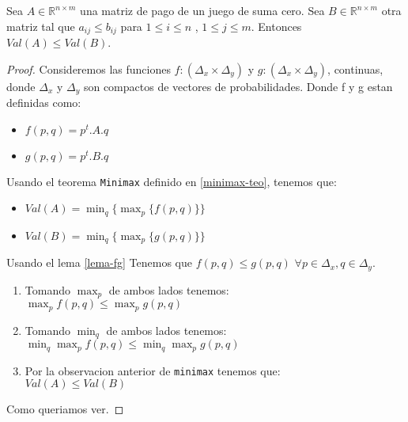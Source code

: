 \begin{theorem}
	Sea $A \in \mathbb{R}^{n \times m}$ una matriz de pago de un juego de suma cero. Sea $B \in \mathbb{R}^{n \times m}$ otra matriz tal que $a_{ij} \leq b_{ij}$ para $1 \leq i \leq n$   ,  $1 \leq j \leq m$. Entonces $Val(A) \leq Val(B)$.
\end{theorem}
\begin{proof}
	Consideremos las funciones $f:(\Delta_x \times \Delta_y)$ y $g:(\Delta_x \times \Delta_y)$, continuas, donde $\Delta_x$ y $\Delta_y$ son compactos de vectores de probabilidades. Donde f y g estan definidas como:
	\begin{itemize}
		\item $f(p, q) = p^t.A.q$ 
		\item $g(p, q) = p^t.B.q$ 
	\end{itemize}

	Usando el teorema \texttt{Minimax} definido en \ref{minimax-teo}, tenemos que:
	\begin{itemize}
		\item $Val(A) = \displaystyle\min_{q} \{    \displaystyle\max_{p} \{  f(p, q) \}    \}$
		\item $Val(B) = \displaystyle\min_{q} \{    \displaystyle\max_{p} \{  g(p, q) \}    \}$
	\end{itemize}

	Usando el lema \ref{lema-fg} Tenemos que $f(p, q) \leq g(p, q)$   $\forall p \in \Delta_x, q \in \Delta_y$.\\

\begin{enumerate}
	\item Tomando $\displaystyle\max_{p}$ de ambos lados tenemos:\\
	$ \displaystyle\max_{p} f(p, q) \leq  \displaystyle\max_{p} g(p, q)$
	
	\item Tomando $\displaystyle\min_{q}$ de ambos lados tenemos:\\
	$ \displaystyle\min_{q} \displaystyle\max_{p} f(p, q) \leq  \displaystyle\min_{q} \displaystyle\max_{p} g(p, q)$

	\item Por la observacion anterior de \texttt{minimax} tenemos que:\\
	$ Val(A) \leq Val(B)$
\end{enumerate}
Como queriamos ver.



\end{proof}

